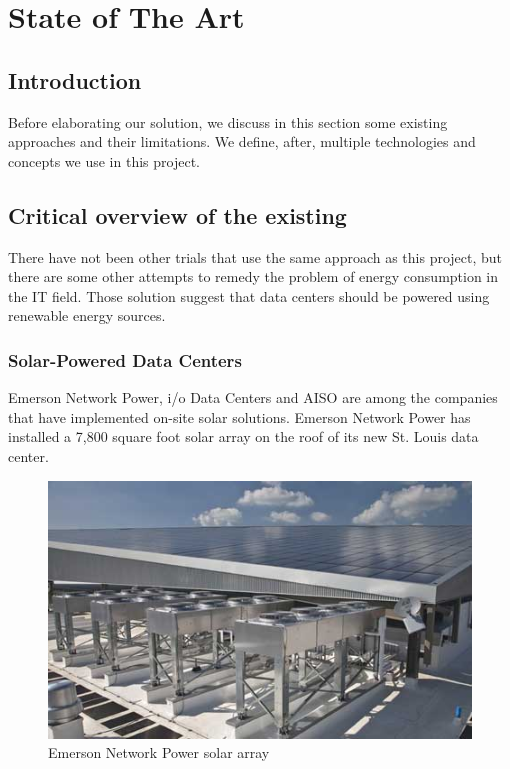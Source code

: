 

\chapter{State of The Art}

\section{Introduction}
    Before elaborating our solution, we discuss in this section some existing approaches and their
    limitations. We define, after, multiple technologies and concepts we use in this project.

\section{Critical overview of the existing}
    There have not been other trials that use the same approach as this project, but there are some other
    attempts to remedy the problem of energy consumption in the IT field. Those solution suggest that
    data centers should be powered using renewable energy sources.

    \subsection{Solar-Powered Data Centers}
        Emerson Network Power, i/o Data Centers and AISO are among the companies that have implemented on-site
        solar solutions. Emerson Network Power has installed a 7,800 square foot solar array on the roof of its
        new St. Louis data center\cite{emerson-network-power-data-centers}.

        \begin{figure}[!h]\centering
            \includegraphics[width=.4\columnwidth]{3-State-of-the-art/figs/emerson-solar-panels.jpg}
            \caption{Emerson Network Power solar array}
        \end{figure}

